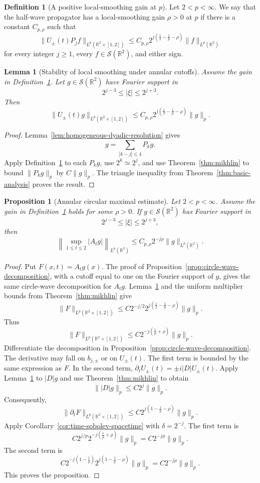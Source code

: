 \documentclass[11pt]{article}
\numberwithin{equation}{section}
\newtheorem{proposition}[theorem]{Proposition}
\newtheorem{lemma}[theorem]{Lemma}
\theoremstyle{definition}
\newtheorem{definition}[theorem]{Definition}
\theoremstyle{remark}
\newcommand{\R}{\mathbb R}
\newcommand{\Sch}{\mathcal S}
\begin{document}
\begin{definition}[A positive local-smoothing gain at $p$]\label{def:positive-gain}
Let $2<p<\infty$.  We say that the half-wave propagator has a local-smoothing gain $\rho>0$ at $p$ if there is a constant $C_{p,\rho}$ such that
\[
\|U_\pm(t)P_jf\|_{L^p(\R^2\times[1,2])}
\le C_{p,\rho}2^{j(\frac12-\frac1p-\rho)}\|f\|_{L^p(\R^2)}
\]
for every integer $j\ge1$, every $f\in\Sch(\R^2)$, and either sign.
\end{definition}

\begin{lemma}[Stability of local smoothing under annular cutoffs]\label{lem:annular-stability}
Assume the gain in Definition~\ref{def:positive-gain}.  Let $g\in\Sch(\R^2)$ have Fourier support in
\[
2^{j-3}\le|\xi|\le2^{j+3}.
\]
Then
\[
\|U_\pm(t)g\|_{L^p(\R^2\times[1,2])}
\le C_{p,\rho}2^{j(\frac12-\frac1p-\rho)}\|g\|_p.
\]
\end{lemma}

\begin{proof}
Lemma~\ref{lem:homogeneous-dyadic-resolution} gives
\[
g=\sum_{|k-j|\le4}P_kg.
\]  Apply Definition~\ref{def:positive-gain} to each $P_kg$, use $2^k\simeq2^j$, and use Theorem~\ref{thm:mikhlin} to bound $\|P_kg\|_p$ by $C\|g\|_p$.  The triangle inequality from Theorem~\ref{thm:basic-analysis} proves the result.
\end{proof}

\begin{proposition}[Annular circular maximal estimate]\label{prop:annular-maximal}
Let $2<p<\infty$.  Assume the gain in Definition~\ref{def:positive-gain} holds for some $\rho>0$.  If $g\in\Sch(\R^2)$ has Fourier support in
\[
2^{j-3}\le|\xi|\le2^{j+3},
\]
then
\[
\left\|\sup_{1\le t\le2}|A_tg|\right\|_{L^p(\R^2)}
\le C_{p,\rho}2^{-j\rho}\|g\|_{L^p(\R^2)}.
\]
\end{proposition}

\begin{proof}
Put $F(x,t)=A_tg(x)$.  The proof of Proposition~\ref{prop:circle-wave-decomposition}, with a cutoff equal to one on the Fourier support of $g$, gives the same circle-wave decomposition for $A_tg$.  Lemma~\ref{lem:annular-stability} and the uniform multiplier bounds from Theorem~\ref{thm:mikhlin} give
\[
\|F\|_{L^p(\R^2\times[1,2])}
\le C2^{-j/2}2^{j(\frac12-\frac1p-\rho)}\|g\|_p.
\]
Thus
\[
\|F\|_{L^p(\R^2\times[1,2])}
\le C2^{-j(\frac1p+\rho)}\|g\|_p.
\]
Differentiate the decomposition in Proposition~\ref{prop:circle-wave-decomposition}.  The derivative may fall on $b_{j,\pm}$ or on $U_\pm(t)$.  The first term is bounded by the same expression as $F$.  In the second term, $\partial_tU_\pm(t)=\pm i|D|U_\pm(t)$.  Apply Lemma~\ref{lem:annular-stability} to $|D|g$ and use Theorem~\ref{thm:mikhlin} to obtain
\[
\||D|g\|_p\le C2^j\|g\|_p.
\]
Consequently,
\[
\|\partial_tF\|_{L^p(\R^2\times[1,2])}
\le C2^{j(1-\frac1p-\rho)}\|g\|_p.
\]
Apply Corollary~\ref{cor:time-sobolev-spacetime} with $\delta=2^{-j}$.  The first term is
\[
C2^{j/p}2^{-j(\frac1p+\rho)}\|g\|_p=C2^{-j\rho}\|g\|_p.
\]
The second term is
\[
C2^{-j(1-\frac1p)}2^{j(1-\frac1p-\rho)}\|g\|_p=C2^{-j\rho}\|g\|_p.
\]
This proves the proposition.
\end{proof}
\end{document}
